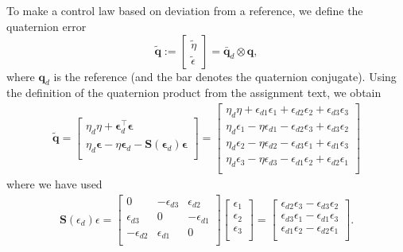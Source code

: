 \subsection{}
To make a control law based on deviation from a reference, we define the quaternion error
 \begin{equation}
	 \tilde{\mathbf{q}} := \left[
	 \begin{array}{c}
		 \tilde{\eta} \\
		 \tilde{\epsilon}
	 \end{array}
	 \right] = \bar{\mathbf{q}}_d \otimes \mathbf{q},
 \end{equation}
where $\mathbf{q}_d$ is the reference (and the bar denotes the quaternion conjugate). Using the definition of the quaternion product from the assignment text, we obtain
\begin{equation}\begin{aligned}
\tilde{\mathbf{q}} =
\begin{bmatrix}
\eta_d \eta + \boldsymbol{\epsilon}^\top_d \boldsymbol{\epsilon}\\
\eta_d \boldsymbol{\epsilon} - \eta \boldsymbol{\epsilon}_d - \mathbf{S}(\boldsymbol{\epsilon}_d)\boldsymbol{\epsilon}\\
\end{bmatrix}
=
\begin{bmatrix}
\eta_d \eta + \epsilon_{d1} \epsilon_1 + \epsilon_{d2}\epsilon_2 + \epsilon_{d3}\epsilon_3\\
\eta_d \epsilon_1 - \eta \epsilon_{d1} - \epsilon_{d2} \epsilon_3 + \epsilon_{d3}\epsilon_2 \\
\eta_d \epsilon_2 - \eta \epsilon_{d2} - \epsilon_{d3} \epsilon_1 + \epsilon_{d1}\epsilon_3 \\
\eta_d \epsilon_3 - \eta \epsilon_{d3} - \epsilon_{d1} \epsilon_2 + \epsilon_{d2}\epsilon_1 \\
\end{bmatrix}
\end{aligned}\end{equation}
where we have used
\begin{equation}\begin{aligned}
\mathbf{S}(\epsilon_d)\epsilon =
\begin{bmatrix}
0 & -\epsilon_{d3} & \epsilon_{d2}\\
\epsilon_{d3} & 0 & -\epsilon_{d1} \\
-\epsilon_{d2} & \epsilon_{d1} & 0 \\
\end{bmatrix}
\begin{bmatrix}
\epsilon_1\\
\epsilon_2\\
\epsilon_3\\
\end{bmatrix}
=
\begin{bmatrix}
\epsilon_{d2} \epsilon_3 - \epsilon_{d3}\epsilon_2\\
\epsilon_{d3} \epsilon_1 - \epsilon_{d1}\epsilon_3\\
\epsilon_{d1} \epsilon_2 - \epsilon_{d2}\epsilon_1\\
\end{bmatrix}.
\end{aligned}\end{equation}
